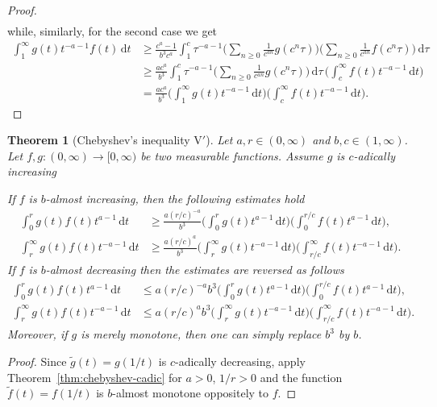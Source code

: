 \documentclass[12pt, reqno]{amsart}%
\theoremstyle{plain}  %
\newtheorem{theorem}{Theorem}[section]
\theoremstyle{definition}  %
\theoremstyle{remark}
\numberwithin{equation}{section}
\renewcommand{\d}{\,\mathrm{d}}
\begin{document}
\begin{proof}
\begin{align*}
\end{align*}
while, similarly,  for the second case we get
\begin{align*}
\int_1^\infty g(t)t^{-a -1} f(t) \d t
&\geq     \frac{c^a-1}{b^{3}c^a} \int_{1}^{c} \tau^{-a -1}
\Big(\sum_{n \geq 0} \frac{1}{c^{a n}} g(c^{n} \tau)  \Big)
\Big(\sum_{n \geq 0} \frac{1}{c^{a n}} f(c^{n} \tau)\Big) \d \tau\\
&\geq \frac{a c^a}{b^{3}} \int_{1}^{c} \tau^{-a -1}\Big( \sum_{n \geq 0} \frac{1}{c^{a n}} g(c^{n} \tau) \Big)  \d \tau\, \Big(\int_c^\infty  f(t)t^{-a -1}  \d t\Big)\\
&= \frac{a c^a}{b^{3}}\Big(\int_1^\infty g(t)t^{-a -1} \d t \Big)
\Big(\int_c^\infty  f(t)t^{-a -1}  \d t\Big).
\end{align*}
\end{proof}


\begin{theorem}[Chebyshev's inequality V$'$]\label{thm:chebyshev-cadic-bis}
Let  $a,r\in (0,\infty)$ and $b, c\in (1,\infty)$.
Let $f ,g: (0, \infty) \to[0,\infty)$ be two measurable functions. Assume $g$ is $c$-adically increasing


If  $f$ is $b$-almost increasing, then the following estimates hold
\begin{align*}
\int_0^r  g(t) f(t) t^{a-1} \d t
&	\geq
\frac{a(r/c)^{-a}}{b^3}\Big( \int_0^r  g(t) t^{a-1} \d t \Big)
\Big( \int_0^{r/c} f(t) t^{a-1}\d t \Big),\\
\int_r^\infty g(t) f(t) t^{-a-1} \d t
&\geq
\frac{a(r/c)^{a}}{b^3} \Big(  \int_r^\infty  g(t) t^{-a-1} \d t \Big)
\Big( \int^\infty _{r/c} f(t) t^{-a-1}\d t \Big).
\end{align*}
If $f$ is $b$-almost decreasing then the estimates are reversed as follows
\begin{align*}
\int_0^r  g(t) f(t) t^{a-1} \d t
&	\leq
a(r/c)^{-a}b^{3} \Big( \int_0^r  g(t) t^{a-1} \d t \Big)
\Big( \int_0^{r/c} f(t) t^{a-1}\d t \Big),\\
\int_r^\infty g(t) f(t) t^{-a-1} \d t
&\leq
a(r/c)^{a}b^{3} \Big( \int_r^\infty  g(t) t^{-a-1} \d t \Big)
\Big( \int^\infty _{r/c} f(t) t^{-a-1}\d t \Big).
\end{align*}
Moreover, if $g$ is merely monotone, then one can simply replace $b^3$ by $b$.
\end{theorem}

\begin{proof}
Since $\tilde{g}(t) = g(1/t)$ is $c$-adically decreasing, apply Theorem~\ref{thm:chebyshev-cadic} for $a>0$, $1/r>0$ and the function $\tilde{f}(t) = f(1/t)$ is $b$-almost monotone oppositely to $f$.
\end{proof}
\end{document}
